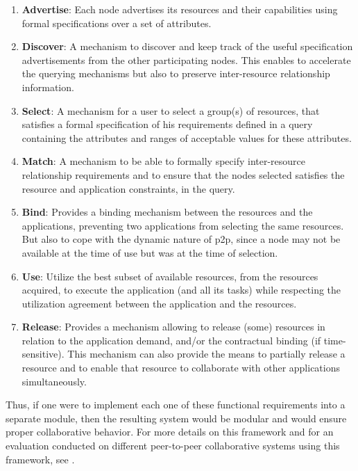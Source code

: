 \documentclass[12pt, titlepage]{uo_temp}
\begin{document}
     \begin{enumerate}
     \item \textbf{Advertise}: Each node advertises its resources and their capabilities
       using formal specifications over a set of attributes.
     \item \textbf{Discover}: A mechanism to discover and keep track of the
       useful specification advertisements from the other participating nodes. This
       enables to accelerate the querying mechanisms but also to preserve inter-resource
       relationship information.
     \item \textbf{Select}: A mechanism for a user to select a group(s) of resources, that
       satisfies a formal specification of his requirements defined in a query containing
       the attributes and ranges of acceptable values for these attributes.
     \item \textbf{Match}: A mechanism to be able to formally
       specify inter-resource relationship requirements and to ensure that
       the nodes selected satisfies the resource and application constraints, in the query.
     \item \textbf{Bind}: Provides a binding mechanism between the resources
       and the applications, preventing two applications from selecting the
       same resources. But also to cope with the dynamic nature of p2p,
       since a node may not be available at the time of use but was at the
       time of selection.
     \item \textbf{Use}: Utilize the best subset of available resources,
       from the resources acquired, to execute the application (and all its
       tasks) while respecting the utilization agreement between the application and the
       resources.
     \item \textbf{Release}: Provides a mechanism allowing to release (some)
       resources in relation to the application demand, and/or the
       contractual binding (if time-sensitive). This mechanism can also
       provide the means to partially release a resource and to enable that resource to
       collaborate with other applications simultaneously.
     \end{enumerate}

     Thus, if one were to implement each one of these functional requirements into a
     separate module, then the resulting system would be modular and would ensure proper
     collaborative behavior. For more details on this framework and for an evaluation
     conducted on different peer-to-peer collaborative systems using this framework, see
     \cite{p2p_collab} \cite{bandara2012evaluation}.
\end{document}
